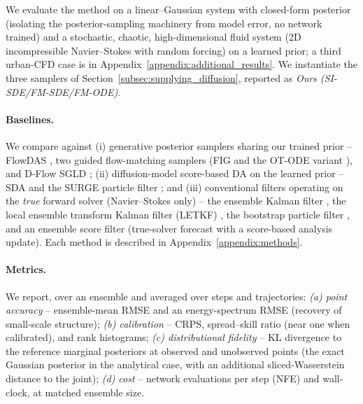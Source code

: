 
\newcommand{\figbox}[3]{%
  \setlength{\fboxsep}{2pt}%
  \fcolorbox{gray!55}{gray!12}{%
    \parbox[c][#2][c]{#1}{\centering\ttfamily\scriptsize
      [figure placeholder]\\[2pt]#3}}%
}

We evaluate the method on a linear--Gaussian system with closed-form posterior (isolating the posterior-sampling machinery from model error, no network trained) and a stochastic, chaotic, high-dimensional fluid system (2D incompressible Navier--Stokes with random forcing) on a learned prior; a third urban-CFD case is in Appendix~\ref{appendix:additional_results}. We instantiate the three samplers of Section~\ref{subsec:supplying_diffusion}, reported as \emph{Ours (SI-SDE/FM-SDE/FM-ODE)}.

\paragraph{Baselines.}
We compare against (i) generative posterior samplers sharing our trained prior -- FlowDAS \cite{chen_flowdas_2025}, two guided flow-matching samplers (FIG \cite{yan_fig_2025} and the OT-ODE variant \cite{pokle_training-free_2024}), and D-Flow SGLD \cite{parikh_d-flow_2026,ben-hamu_d-flow_2024}; (ii) diffusion-model score-based DA on the learned prior -- SDA \cite{rozet_score-based_2023} and the SURGE particle filter \cite{wei_surge_2026}; and (iii) conventional filters operating on the \emph{true} forward solver (Navier--Stokes only) -- the ensemble Kalman filter \cite{evensen_data_2022}, the local ensemble transform Kalman filter (LETKF) \cite{hunt_efficient_2007}, the bootstrap particle filter \cite{carrassi_data_2018}, and an ensemble score filter \cite{bao_ensemble_2024} (true-solver forecast with a score-based analysis update). Each method is described in Appendix~\ref{appendix:methods}.

\paragraph{Metrics.}
We report, over an ensemble and averaged over steps and trajectories: \emph{(a) point accuracy} -- ensemble-mean RMSE and an energy-spectrum RMSE (recovery of small-scale structure); \emph{(b) calibration} -- CRPS, spread--skill ratio (near one when calibrated), and rank histograms; \emph{(c) distributional fidelity} -- KL divergence to the reference marginal posteriors at observed and unobserved points (the exact Gaussian posterior in the analytical case, with an additional sliced-Wasserstein distance to the joint); \emph{(d) cost} -- network evaluations per step (NFE) and wall-clock, at matched ensemble size.

